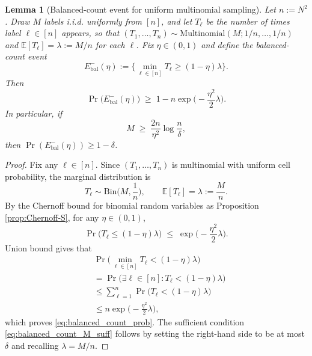 \documentclass[aps,prx,reprint,superscriptaddress,amsmath,amssymb,longbibliography,floatfix]{revtex4-2}
\newcommand{\dsE}{\mathbb{E}}
\theoremstyle{plain}
\newtheorem{lemma}[theorem]{Lemma}
\theoremstyle{definition}
\theoremstyle{remark}
\begin{document}
\begin{lemma}[Balanced-count event for uniform multinomial sampling]\label{lem:balanced_count}
Let $n:=N^2$. Draw $M$ labels i.i.d. uniformly from $[n]$, and let
$T_\ell$ be the number of times label $\ell\in[n]$ appears, so that
$(T_1,\dots,T_n)\sim \mathrm{Multinomial}(M;1/n,\dots,1/n)$ and
$\dsE[T_\ell]=\lambda:=M/n$ for each $\ell$.
Fix $\eta\in(0,1)$ and define the balanced-count event
\begin{equation}
E_{\mathrm{bal}}^{-}(\eta):=\Big\{\min_{\ell\in[n]} T_\ell \ge (1-\eta)\lambda\Big\}.
\label{eq:app-local-balanced-count-event}
\end{equation}
Then
\begin{equation}\label{eq:balanced_count_prob}
\Pr\big(E_{\mathrm{bal}}^{-}(\eta)\big)\;\ge\;1-n\exp\!\Big(-\frac{\eta^2}{2}\lambda\Big).
\end{equation}
In particular, if
\begin{equation}\label{eq:balanced_count_M_suff}
M \;\ge\; \frac{2n}{\eta^2}\log\frac{n}{\delta},
\end{equation}
then $\Pr(E_{\mathrm{bal}}^{-}(\eta))\ge 1-\delta$.
\end{lemma}

\begin{proof}
Fix any $\ell\in[n]$. Since $(T_1,\dots,T_n)$ is multinomial with uniform cell probability,
the marginal distribution is
\[
T_\ell \sim \mathrm{Bin}\Big(M,\frac{1}{n}\Big),\qquad \dsE[T_\ell]=\lambda:=\frac{M}{n}.
\]
By the Chernoff bound for binomial random variables
as Proposition \ref{prop:Chernoff-S}, for any $\eta\in(0,1)$,
\begin{equation}\label{eq:chernoff_one_bin}
\Pr\big(T_\ell \le (1-\eta)\lambda\big)\;\le\;\exp\!\Big(-\frac{\eta^2}{2}\lambda\Big).
\end{equation}
Union bound gives that %
\[
\begin{aligned}
&\Pr\Big(\min_{\ell\in[n]}T_\ell < (1-\eta)\lambda\Big)\\
&=
\Pr\Big(\exists \ell\in[n]: T_\ell < (1-\eta)\lambda\Big)\\
&\le
\sum_{\ell=1}^n \Pr\big(T_\ell < (1-\eta)\lambda\big)\\
&\le
n\exp\!\Big(-\frac{\eta^2}{2}\lambda\Big),
\end{aligned}
\]
which proves \eqref{eq:balanced_count_prob}. The sufficient condition \eqref{eq:balanced_count_M_suff}
follows by setting the right-hand side to be at most $\delta$ and recalling $\lambda=M/n$.
\end{proof}
\end{document}
